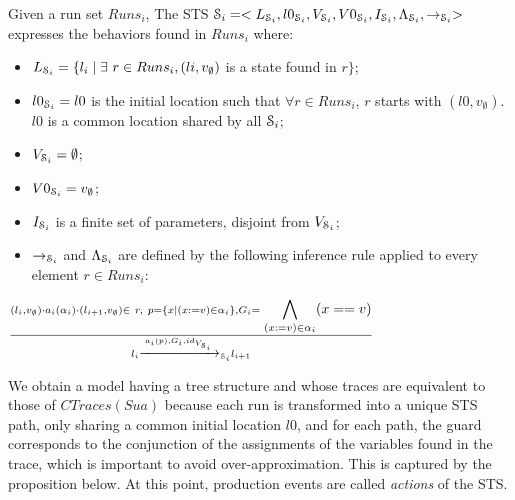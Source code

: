 \begin{definition}
Given a run set $Runs_i$, The STS $\EuScript{S}_i=<L_{\EuScript{S}_i},
  l0_{\EuScript{S}_i},V_{\EuScript{S}_i},\\V0_{\EuScript{S}_i},
  I_{\EuScript{S}_i}, \Lambda_{\EuScript{S}_i},\rightarrow_{\EuScript{S}_i}>$
  expresses the behaviors found in $Runs_i$ where:

	\begin{itemize}
    \item $L_{\EuScript{S}_i}= \{l_i \mid \exists ~r \in Runs_i,
      (li,v_\emptyset)$ is a state found in $r\}$;

    \item $l0_{\EuScript{S}_i} = l0$ is the initial location
      such that $\forall r \in Runs_i$, $r$ starts with
      $(l0,v_\emptyset)$. $l0$ is a common location shared by all
      $\EuScript{S}_i$;

    \item $V_{\EuScript{S}_i}=\emptyset$;

    \item $V0_{\EuScript{S}_i}=v_\emptyset$;

   \item $I_{\EuScript{S}_i}$ is a finite set of parameters,
        disjoint from $V_{\EuScript{S}_i}$;

    \item $\rightarrow_{\EuScript{S}_i}$ and
      $\Lambda_{\EuScript{S}_i}$ are defined by the following
      inference rule applied to every element $r\in Runs_i$:
	\end{itemize}

  \begin{center}
    {\Large
        $\frac{(l_i,v_\emptyset) \cdot a_i(\alpha_i) \cdot (l_{i+1},v_\emptyset)
        \in ~r, ~p = \{x \mid (x:=v)\in \alpha_i \}, G_i=\displaystyle
        \bigwedge_{(x:=v)\in \alpha_i}(x == v)}
        {l_i \xrightarrow{a_i(p),G_i,id_{V_{\EuScript{S}_i}}}_{\EuScript{S}_i} l_{i+1}}$
    }
  \end{center}


  \label{def:runset_to_sts}
\end{definition}

We obtain a model having a tree structure and whose traces are
equivalent \cite{petrenko06} to those of $CTraces(Sua)$ because
each run is transformed into a unique STS path, only sharing a
common initial location $l0$, and for each path, the guard
corresponds to the conjunction of the assignments of the
variables found in the trace, which is important to avoid
over-approximation. This is captured by the proposition below. At
this point, production events are called \emph{actions} of the STS.

